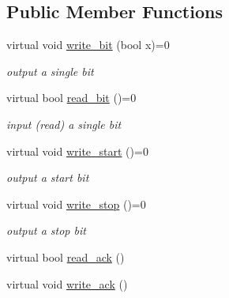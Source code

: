 \subsection*{Public Member Functions}
\begin{DoxyCompactItemize}
\item 
\mbox{\label{classhwlib_1_1i2c__primitives_a959052f7d29732c4371895b29f4e0b64}} 
virtual void \mbox{\hyperlink{classhwlib_1_1i2c__primitives_a959052f7d29732c4371895b29f4e0b64}{write\+\_\+bit}} (bool x)=0
\begin{DoxyCompactList}\small\item\em output a single bit \end{DoxyCompactList}\item 
\mbox{\label{classhwlib_1_1i2c__primitives_a55a6e105449bcba89fd329a80a065f2c}} 
virtual bool \mbox{\hyperlink{classhwlib_1_1i2c__primitives_a55a6e105449bcba89fd329a80a065f2c}{read\+\_\+bit}} ()=0
\begin{DoxyCompactList}\small\item\em input (read) a single bit \end{DoxyCompactList}\item 
\mbox{\label{classhwlib_1_1i2c__primitives_adc2fc22b39cc81a9871f64325e8e3911}} 
virtual void \mbox{\hyperlink{classhwlib_1_1i2c__primitives_adc2fc22b39cc81a9871f64325e8e3911}{write\+\_\+start}} ()=0
\begin{DoxyCompactList}\small\item\em output a start bit \end{DoxyCompactList}\item 
\mbox{\label{classhwlib_1_1i2c__primitives_a557e3b1319ec01ec0e1f850b24915aa9}} 
virtual void \mbox{\hyperlink{classhwlib_1_1i2c__primitives_a557e3b1319ec01ec0e1f850b24915aa9}{write\+\_\+stop}} ()=0
\begin{DoxyCompactList}\small\item\em output a stop bit \end{DoxyCompactList}\item 
virtual bool \mbox{\hyperlink{classhwlib_1_1i2c__primitives_adfa6c493163d397f58a3e2ba4617dbac}{read\+\_\+ack}} ()
\item 
virtual void \mbox{\hyperlink{classhwlib_1_1i2c__primitives_a711df86e5129b7daeff7a622b7b734c6}{write\+\_\+ack}} ()

\end{DoxyCompactItemize}
